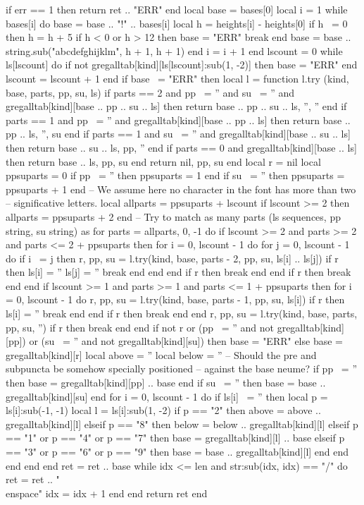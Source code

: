 \begin{luacode*}
    if err == 1 then return ret .. "ERR" end
    local base = bases[0]
    local i = 1
    while bases[i] do
      base = base .. "!" .. bases[i]
      local h = heights[i] - heights[0]
      if h ~= 0 then
	h = h + 5
	if h < 0 or h > 12 then
	  base = "ERR"
	  break
	end
	base = base .. string.sub("abcdefghijklm", h + 1, h + 1)
      end
      i = i + 1
    end
    lscount = 0
    while ls[lscount] do
      if not gregalltab[kind][ls[lscount]:sub(1, -2)] then base = "ERR" end
      lscount = lscount + 1
    end
    if base ~= "ERR" then
      local l = {}
      function l.try (kind, base, parts, pp, su, ls)
	if parts == 2 and pp ~= '' and su ~= '' and gregalltab[kind][base .. pp .. su .. ls] then return base .. pp .. su .. ls, '', '' end
	if parts == 1 and pp ~= '' and gregalltab[kind][base .. pp .. ls] then return base .. pp .. ls, '', su end
	if parts == 1 and su ~= '' and gregalltab[kind][base .. su .. ls] then return base .. su .. ls, pp, '' end
	if parts == 0 and gregalltab[kind][base .. ls] then return base .. ls, pp, su end
	return nil, pp, su
      end
      local r = nil
      local ppsuparts = 0
      if pp ~= '' then ppsuparts = 1 end
      if su ~= '' then ppsuparts = ppsuparts + 1 end
      -- We assume here no character in the font has more than two
      -- significative letters.
      local allparts = ppsuparts + lscount
      if lscount >= 2 then allparts = ppsuparts + 2 end
      -- Try to match as many parts (ls sequences, pp string, su string) as
      for parts = allparts, 0, -1 do
	if lscount >= 2 and parts >= 2 and parts <= 2 + ppsuparts then
	  for i = 0, lscount - 1 do
	    for j = 0, lscount - 1 do
	      if i ~= j then
		r, pp, su = l.try(kind, base, parts - 2, pp, su, ls[i] .. ls[j])
		if r then
		  ls[i] = ''
		  ls[j] = ''
		  break
		end
	      end
	    end
	    if r then break end
	  end
	  if r then break end
	end
	if lscount >= 1 and parts >= 1 and parts <= 1 + ppsuparts then
	  for i = 0, lscount - 1 do
	    r, pp, su = l.try(kind, base, parts - 1, pp, su, ls[i])
	    if r then
	      ls[i] = ''
	      break
	    end
	  end
	  if r then break end
	end
	r, pp, su = l.try(kind, base, parts, pp, su, '')
	if r then break end
      end
      if not r or (pp ~= '' and not gregalltab[kind][pp]) or (su ~= '' and not gregalltab[kind][su]) then
	base = "ERR"
      else
	base = gregalltab[kind][r]
	local above = ''
	local below = ''
	-- Should the pre and subpuncta be somehow specially positioned
	-- against the base neume?
	if pp ~= '' then base = gregalltab[kind][pp] .. base end
	if su ~= '' then base = base .. gregalltab[kind][su] end
	for i = 0, lscount - 1 do
	  if ls[i] ~= '' then
	    local p = ls[i]:sub(-1, -1)
	    local l = ls[i]:sub(1, -2)
	    if p == "2" then
	      above = above .. gregalltab[kind][l]
	    elseif p == "8" then
	      below = below .. gregalltab[kind][l]
	    elseif p == "1" or p == "4" or p == "7" then
	      base = gregalltab[kind][l] .. base
	    elseif p == "3" or p == "6" or p == "9" then
	      base = base .. gregalltab[kind][l]
	    end
	  end
	end
      end
    end
    ret = ret .. base
    while idx <= len and str:sub(idx, idx) == "/" do
      ret = ret .. "\\enspace{}"
      idx = idx + 1
    end
  end
  return ret
end
\end{luacode*}
